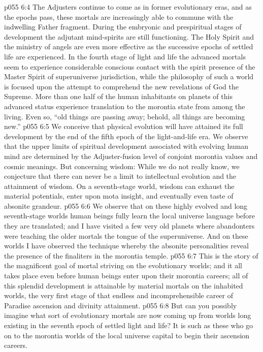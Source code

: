 \pc \vs p055 6:4 The Adjusters continue to come as in former evolutionary eras, and as the epochs pass, these mortals are increasingly able to commune with the indwelling Father fragment. During the embryonic and prespiritual stages of development the adjutant mind\hyp{}spirits are still functioning. The Holy Spirit and the ministry of angels are even more effective as the successive epochs of settled life are experienced. In the fourth stage of light and life the advanced mortals seem to experience considerable conscious contact with the spirit presence of the Master Spirit of superuniverse jurisdiction, while the philosophy of such a world is focused upon the attempt to comprehend the new revelations of God the Supreme. More than one half of the human inhabitants on planets of this advanced status experience translation to the morontia state from among the living. Even so, “old things are passing away; behold, all things are becoming new.”
\vs p055 6:5 We conceive that physical evolution will have attained its full development by the end of the fifth epoch of the light\hyp{}and\hyp{}life era. We observe that the upper limits of spiritual development associated with evolving human mind are determined by the Adjuster\hyp{}fusion level of conjoint morontia values and cosmic meanings. But concerning wisdom: While we do not really know, we conjecture that there can never be a limit to intellectual evolution and the attainment of wisdom. On a seventh\hyp{}stage world, wisdom can exhaust the material potentials, enter upon mota insight, and eventually even taste of absonite grandeur.
\vs p055 6:6 We observe that on these highly evolved and long seventh\hyp{}stage worlds human beings fully learn the local universe language before they are translated; and I have visited a few very old planets where abandonters were teaching the older mortals the tongue of the superuniverse. And on these worlds I have observed the technique whereby the absonite personalities reveal the presence of the finaliters in the morontia temple.
\pc \vs p055 6:7 This is the story of the magnificent goal of mortal striving on the evolutionary worlds; and it all takes place even before human beings enter upon their morontia careers; all of this splendid development is attainable by material mortals on the inhabited worlds, the very first stage of that endless and incomprehensible career of Paradise ascension and divinity attainment.
\vs p055 6:8 But can you possibly imagine what sort of evolutionary mortals are now coming up from worlds long existing in the seventh epoch of settled light and life? It is such as these who go on to the morontia worlds of the local universe capital to begin their ascension careers.
